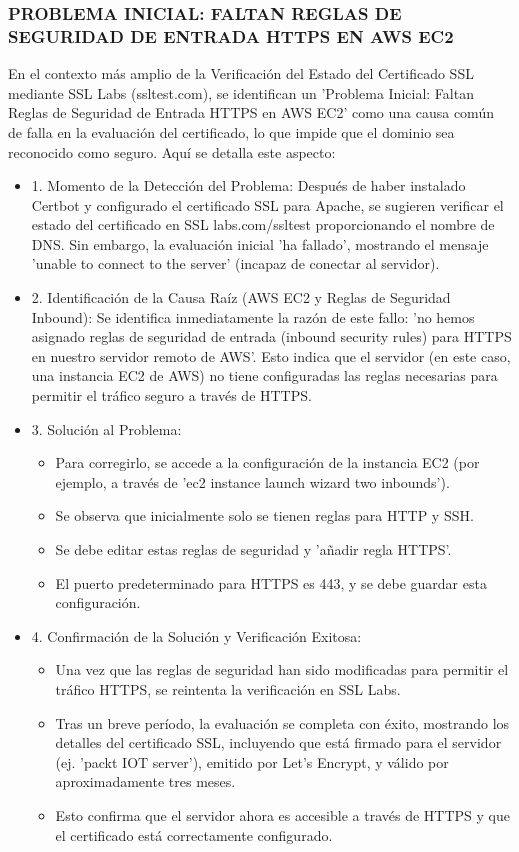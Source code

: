 \documentclass{report}
\begin{document}
\subsubsection{PROBLEMA INICIAL: FALTAN REGLAS DE SEGURIDAD DE ENTRADA HTTPS EN AWS EC2}
En el contexto más amplio de la Verificación del Estado del Certificado SSL mediante SSL Labs (ssltest.com), se  
identifican un 'Problema Inicial: Faltan Reglas de Seguridad de Entrada HTTPS en AWS EC2' como una causa común de falla en 
la evaluación del certificado, lo que impide que el dominio sea reconocido como seguro.
Aquí se detalla este aspecto:
\begin{itemize}
    \item 1. Momento de la Detección del Problema: Después de haber instalado Certbot y configurado el certificado SSL para Apache, 
    se  sugieren verificar el estado del certificado en SSL labs.com/ssltest proporcionando el nombre de DNS. Sin embargo, 
    la evaluación inicial 'ha fallado', mostrando el mensaje 'unable to connect to the server' (incapaz de conectar al servidor).
    \item 2. Identificación de la Causa Raíz (AWS EC2 y Reglas de Seguridad Inbound): Se identifica inmediatamente la razón de 
    este fallo: 'no hemos asignado reglas de seguridad de entrada (inbound security rules) para HTTPS en nuestro servidor remoto de AWS'. 
    Esto indica que el servidor (en este caso, una instancia EC2 de AWS) no tiene configuradas las reglas necesarias para permitir el 
    tráfico seguro a través de HTTPS.
    \item 3. Solución al Problema:
        \begin{itemize}
            \item Para corregirlo, se accede a la configuración de la instancia EC2 (por ejemplo, a través de 'ec2 instance launch wizard 
            two inbounds').
            \item Se observa que inicialmente solo se tienen reglas para HTTP y SSH.
            \item Se debe editar estas reglas de seguridad y 'añadir regla HTTPS'.
            \item El puerto predeterminado para HTTPS es 443, y se debe guardar esta configuración.
        \end{itemize}
    \item 4. Confirmación de la Solución y Verificación Exitosa:
        \begin{itemize}
            \item Una vez que las reglas de seguridad han sido modificadas para permitir el tráfico HTTPS, se reintenta la 
            verificación en SSL Labs.
            \item Tras un breve período, la evaluación se completa con éxito, mostrando los detalles del certificado SSL, 
            incluyendo que está firmado para el servidor (ej. 'packt IOT server'), emitido por Let's Encrypt, y válido por 
            aproximadamente tres meses.
            \item Esto confirma que el servidor ahora es accesible a través de HTTPS y que el certificado está correctamente configurado.
        \end{itemize}
\end{itemize}
\end{document}
